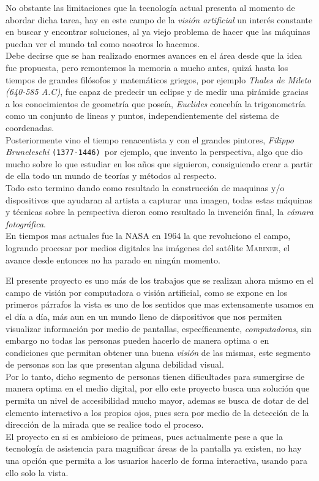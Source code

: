 \documentclass[12pt]{book} %
\begin{document}
	No obstante las limitaciones que la tecnología actual presenta al momento de abordar dicha tarea, hay en este campo de la
	\textit{visión artificial} un interés constante en buscar y encontrar soluciones, al ya viejo problema de hacer que las 
	máquinas puedan ver el mundo tal como nosotros lo hacemos.\\
	Debe decirse que se han realizado enormes avances en el área 
	desde que la idea fue propuesta, pero remontemos la memoria a mucho antes, quizá hasta los tiempos 
	de grandes filósofos y matemáticos griegos, por ejemplo \textit{Thales de Mileto (640-585 A.C)}, fue capaz de predecir un 
	eclipse y de medir una pirámide gracias a los conocimientos de geometría que poseía,
	\textit{Euclides} concebía la trigonometría como un conjunto de lineas y puntos, independientemente del sistema de coordenadas.\\	
	Posteriormente vino el tiempo renacentista y con el grandes pintores, \textit{Filippo Bruneleschi} \texttt{(1377-1446) }por ejemplo, 
	que invento	la perspectiva, algo que dio mucho sobre lo que estudiar en los años que siguieron, consiguiendo crear a partir 
	de ella todo 	un mundo de teorías y métodos al respecto.\\
	Todo esto termino dando como resultado la construcción de maquinas y/o dispositivos que ayudaran al artista a capturar una 
	imagen, todas estas máquinas y técnicas sobre la perspectiva dieron como resultado la invención final, 
	la \textit{cámara fotográfica}.\\
	En tiempos mas actuales fue la \textsc{NASA} en 1964 la que revoluciono el campo, logrando procesar por medios digitales
	las imágenes del satélite \textsc{Mariner}, el avance desde entonces no ha parado en ningún momento.
	
	El presente proyecto es uno más de los trabajos que se realizan ahora mismo en el campo de visión por computadora o visión 
	artificial, como se expone en los primeros párrafos la vista es uno de los sentidos que mas extensamente usamos en el día a día,
	más aun en un mundo lleno de dispositivos que nos permiten visualizar información por medio de pantallas, específicamente,
	\textit{computadoras}, sin embargo no todas las personas pueden hacerlo de manera optima o en condiciones que permitan 
	obtener una buena \textit{visión} de las mismas, este segmento de personas son las que presentan alguna debilidad visual.\\
	Por lo tanto, dicho segmento de personas tienen dificultades para sumergirse de manera optima en el medio digital, por ello
	este proyecto busca una solución que permita un nivel de accesibilidad mucho mayor, ademas se busca de dotar de del elemento 
	interactivo a los propios ojos, pues sera por medio de la detección de la dirección de la mirada que se realice todo el proceso.\\	
	El proyecto en si es ambicioso de primeas, pues actualmente pese a que la tecnología de asistencia para magnificar áreas de la
	pantalla ya existen, no hay una opción que permita a los usuarios hacerlo de forma interactiva, usando para ello solo la vista.\\
	
\end{document}
